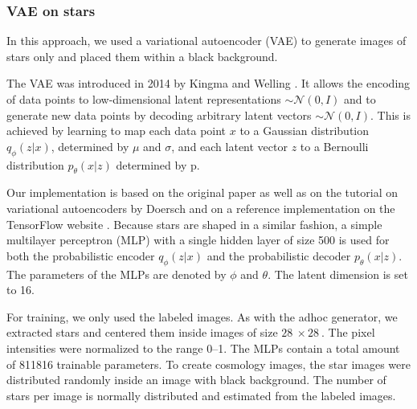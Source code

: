 \documentclass[10pt,conference,compsocconf]{IEEEtran}
\newcommand\TODO[1]{\textcolor{red}{#1}} %
\begin{document}
\subsubsection{VAE on stars} %
In this approach, we used a variational autoencoder (VAE) to generate images of stars only and placed them within a black background. 

The VAE was introduced in 2014 by Kingma and Welling \cite{DBLP:journals/corr/KingmaW13}. It allows the encoding of data points to low-dimensional latent representations  $\sim\mathcal{N}(0, I)$ and to generate new data points by decoding arbitrary latent vectors $\sim\mathcal{N}(0, I)$. This is achieved by learning to map each data point $x$ to a Gaussian distribution $q_{\phi}(z|x)$, determined by $\mu$ and $\sigma$, and each latent vector $z$ to a Bernoulli distribution $p_{\theta}(x|z)$ determined by p.
 
Our implementation is based on the original paper as well as on the tutorial on variational autoencoders by Doersch \cite{doersch2016tutorial} and on a reference implementation on the TensorFlow website \cite{cvaetf}. Because stars are shaped in a similar fashion, a simple multilayer perceptron (MLP) with a single hidden layer of size \SI{500}{} is used for both the probabilistic encoder $q_{\phi}(z|x)$ and the probabilistic decoder $p_{\theta}(x|z)$. The parameters of the MLPs are denoted by $\phi$ and $\theta$. The latent dimension is set to \SI{16}{}. 

For training, we only used the labeled images. As with the adhoc generator, we extracted stars and centered them inside images of size $\SI{28}{}\times\SI{28}{}$. The pixel intensities were normalized to the range \SIrange{0}{1}{}. The MLPs contain a total amount of \SI{811816}{} trainable parameters. To create cosmology images, the star images were distributed randomly inside an image with black background. The number of stars per image is normally distributed and estimated from the labeled images. 
\end{document}
